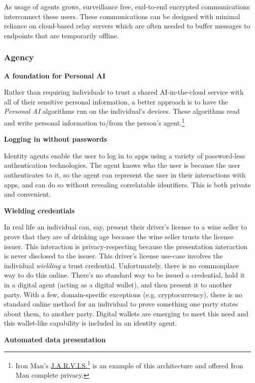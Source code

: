 \documentclass[11pt, oneside]{article}   	%
\newcommand{\hyperfootnote}[1][]{\def\ArgI{{#1}}\hyperfootnoteRelay}
\newcommand\hyperfootnoteRelay[2][]{\href{#1#2}{\ArgI}\footnote{\href{#1#2}{#2}}}
\begin{document}
As usage of agents grows, surveillance free, end-to-end encrypted communications interconnect these users. These communications can be designed with minimal reliance on cloud-based relay servers which are often needed to buffer messages to endpoints that are temporarily offline.

\subsubsection{Agency}

\textbf{A foundation for Personal AI}

Rather than requiring individuals to trust a shared AI-in-the-cloud service with all of their sensitive personal information, a better approach is to have the \emph{Personal AI} algorithms run on the individual's devices. These algorithms read and write personal information to/from the person's agent.\footnote{Iron Man's \hyperfootnote[J.A.R.V.I.S.][https://]{en.wikipedia.org/wiki/J.A.R.V.I.S.} is an example of this architecture and offered Iron Man complete privacy.}

\textbf{Logging in without passwords}

Identity agents enable the user to log in to apps using a variety of password-less authentication technologies. The agent knows who the user is because the user authenticates to it, so the agent can represent the user in their interactions with apps, and can do so without revealing correlatable identifiers. This is both private and convenient.

\textbf{Wielding credentials}

In real life an individual can, say, present their driver's license to a wine seller to prove that they are of drinking age because the wine seller trusts the license issuer. This interaction is privacy-respecting because the presentation interaction is never disclosed to the issuer. This driver's license use-case involves the individual \emph{wielding} a trust credential. Unfortunately, there is no commonplace way to do this online. There's no standard way to be issued a credential, hold it in a digital agent (acting as a digital wallet), and then present it to another party. With a few, domain-specific exceptions (e.g. cryptocurrency), there is no standard online method for an individual to prove something one party states about them, to another party. Digital wallets are emerging to meet this need and this wallet-like capability is included in an identity agent.

\textbf{Automated data presentation}
\end{document}
